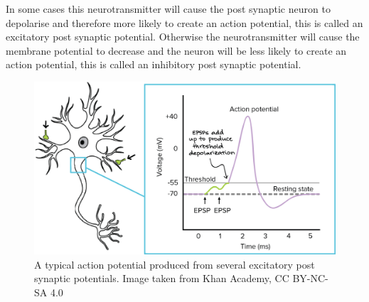 \documentclass{epsrc}
\begin{document}
\noindent
In some cases this neurotransmitter will cause the post synaptic neuron to depolarise and therefore more likely to create an action potential, this is called an excitatory post synaptic potential. Otherwise the neurotransmitter will cause the membrane potential to decrease and the neuron will be less likely to create an action potential, this is called an inhibitory post synaptic potential.

\begin{figure}[ht]
  \includegraphics[width=0.7\linewidth]{img/Action_potential.png}
  \caption{A typical action potential produced from several excitatory post synaptic potentials. Image taken from Khan Academy, CC BY-NC-SA 4.0 }
  \label{fig:synapse}
\end{figure}
\end{document}
